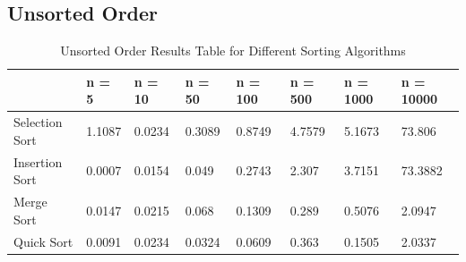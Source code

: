 \subsection{Unsorted Order}

\begin{table}[ht]
    \centering
    \caption{Unsorted Order Results Table for Different Sorting Algorithms}
    \begin{tabular}[t]{|l| l l l l l l l|} 
    \hline
    & n = 5 & n = 10 & n = 50 & n = 100 & n = 500 & n = 1000 & n = 10000\\ [0.5ex] 
    \hline
    Selection Sort & 1.1087 &	0.0234 &	0.3089 & 	0.8749 & 	4.7579	& 5.1673 &	73.806  \\ 
    \hline
    Insertion Sort & 0.0007 &	0.0154 &	0.049	 & 0.2743	 & 2.307	& 3.7151 &	73.3882 \\
    \hline
    Merge Sort & 0.0147 &	0.0215 &	0.068	 & 0.1309	 & 0.289	& 0.5076 &	2.0947\\
    \hline
    Quick Sort & 0.0091 &	0.0234 &	0.0324 & 	0.0609 & 	0.363	& 0.1505 &	2.0337 \\
     \hline
    \end{tabular}
\end{table}

\
\begin{figure}[!ht]
	\centerline{}
	\label{fig:figure1}
\end{figure}
